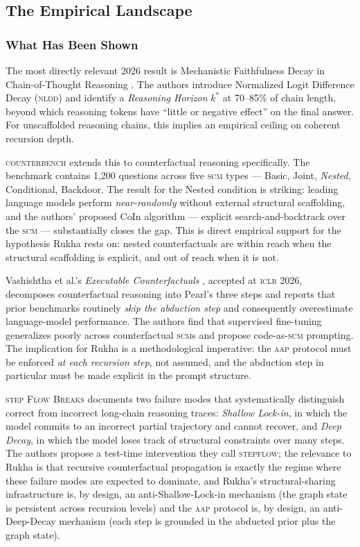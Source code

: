 \documentclass[11pt]{article}
\theoremstyle{rukha}
\begin{document}
\subsection{The Empirical Landscape}

\subsubsection{What Has Been Shown}

The most directly relevant 2026 result is Mechanistic Faithfulness
Decay in Chain-of-Thought Reasoning \cite{faithfulnessdecay}. The authors
introduce Normalized Logit Difference Decay (\textsc{nldd}) and identify
a \emph{Reasoning Horizon} $k^*$ at \mbox{70–85\%} of chain length, beyond
which reasoning tokens have ``little or negative effect'' on the final
answer. For unscaffolded reasoning chains, this implies an empirical
ceiling on coherent recursion depth.

\textsc{counterbench} \cite{counterbench} extends this to counterfactual
reasoning specifically. The benchmark contains 1,200 questions across
five \textsc{scm} types --- Basic, Joint, \emph{Nested}, Conditional,
Backdoor. The result for the Nested condition is striking: leading
language models perform \emph{near-randomly} without external structural
scaffolding, and the authors' proposed CoIn algorithm --- explicit
search-and-backtrack over the \textsc{scm} --- substantially closes the
gap. This is direct empirical support for the hypothesis Rukha rests on:
nested counterfactuals are within reach when the structural scaffolding
is explicit, and out of reach when it is not.

Vashishtha et al.'s \emph{Executable Counterfactuals}
\cite{executablecounterfactuals}, accepted at \textsc{iclr} 2026,
decomposes counterfactual reasoning into Pearl's three steps and reports
that prior benchmarks routinely \emph{skip the abduction step} and
consequently overestimate language-model performance. The authors find
that supervised fine-tuning generalizes poorly across counterfactual
\textsc{scm}s and propose code-as-\textsc{scm} prompting. The
implication for Rukha is a methodological imperative: the
\textsc{aap} protocol must be enforced \emph{at each recursion step},
not assumed, and the abduction step in particular must be made explicit
in the prompt structure.

\textsc{step Flow Breaks} \cite{stepflowbreaks} documents two failure
modes that systematically distinguish correct from incorrect long-chain
reasoning traces: \emph{Shallow Lock-in}, in which the model commits to
an incorrect partial trajectory and cannot recover, and \emph{Deep Decay},
in which the model loses track of structural constraints over many
steps. The authors propose a test-time intervention they call
\textsc{stepflow}; the relevance to Rukha is that recursive
counterfactual propagation is exactly the regime where these failure
modes are expected to dominate, and Rukha's structural-sharing
infrastructure is, by design, an anti-Shallow-Lock-in mechanism (the
graph state is persistent across recursion levels) and the
\textsc{aap} protocol is, by design, an anti-Deep-Decay mechanism (each
step is grounded in the abducted prior plus the graph state).
\end{document}
